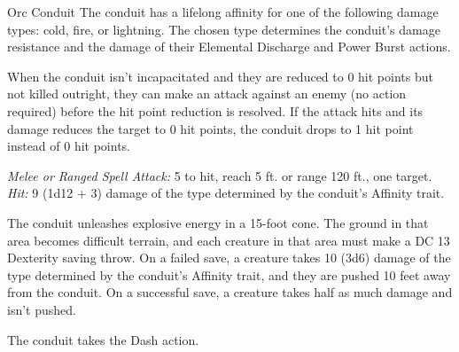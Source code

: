 \documentclass[10pt,a4paper,twoside,bg=print,twocolumn,openany,nodeprecatedcode]{dndbook}
\begin{document}
\begin{DndMonster}[float=t]{Orc Conduit}
\DndMonsterBasics[
armor-class = {13 (studded leather armor)},
hit-points = {\DndDice{4d8 + 12}},
speed = {35 ft.}
]
\DndMonsterAbilityScores[
 str = 14,
 dex = 12,
 con = 16,
 int = 10,
 wis = 12,
 cha = 16
]
\DndMonsterDetails[
skills = {Perception +3},
damage-resistances = {determined by the conduit's affinity trait},
senses = {darkvision 60 ft., passive perception 13},
languages = {Common, Orc},
challenge = 1,
]
The conduit has a lifelong affinity for one of the following damage types: cold, fire, or lightning. The chosen type determines the conduit's damage resistance and the damage of their Elemental Discharge and Power Burst actions.

When the conduit isn't incapacitated and they are reduced to 0 hit points but not killed outright, they can make an attack against an enemy (no action required) before the hit point reduction is resolved. If the attack hits and its damage reduces the target to 0 hit points, the conduit drops to 1 hit point instead of 0 hit points.

\textsl{Melee or Ranged Spell Attack:} 5 to hit, reach 5 ft. or range 120 ft., one target. \textsl{Hit:} 9 (1d12 + 3) damage of the type determined by the conduit's Affinity trait.

The conduit unleashes explosive energy in a 15-foot cone. The ground in that area becomes difficult terrain, and each creature in that area must make a DC 13 Dexterity saving throw. On a failed save, a creature takes 10 (3d6) damage of the type determined by the conduit's Affinity trait, and they are pushed 10 feet away from the conduit. On a successful save, a creature takes half as much damage and isn't pushed.

The conduit takes the Dash action.

\end{DndMonster}
\end{document}
